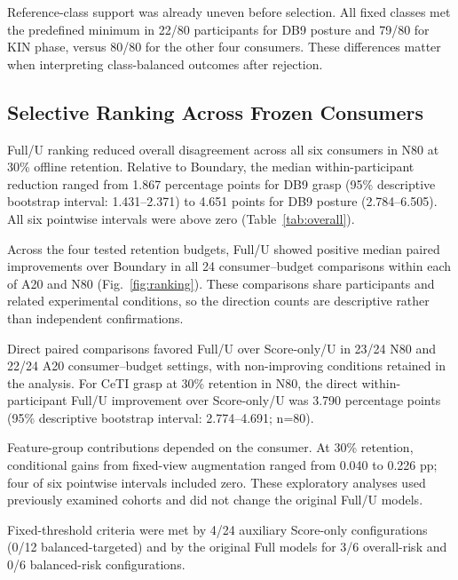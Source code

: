 Reference-class support was already uneven before selection. All fixed classes met the predefined minimum in 22/80 participants for DB9 posture and 79/80 for KIN phase, versus 80/80 for the other four consumers. These differences matter when interpreting class-balanced outcomes after rejection.

\subsection{Selective Ranking Across Frozen Consumers}\label{selective-ranking-across-frozen-consumers}
Full/U ranking reduced overall disagreement across all six consumers in N80 at 30\% offline retention. Relative to Boundary, the median within-participant reduction ranged from 1.867 percentage points for DB9 grasp (95\% descriptive bootstrap interval: 1.431--2.371) to 4.651 points for DB9 posture (2.784--6.505). All six pointwise intervals were above zero (Table~\ref{tab:overall}).

Across the four tested retention budgets, Full/U showed positive median paired improvements over Boundary in all 24 consumer--budget comparisons within each of A20 and N80 (Fig.~\ref{fig:ranking}). These comparisons share participants and related experimental conditions, so the direction counts are descriptive rather than independent confirmations.

Direct paired comparisons favored Full/U over Score-only/U in 23/24 N80 and 22/24 A20 consumer--budget settings, with non-improving conditions retained in the analysis. For CeTI grasp at 30\% retention in N80, the direct within-participant Full/U improvement over Score-only/U was 3.790 percentage points (95\% descriptive bootstrap interval: 2.774--4.691; n=80).



Feature-group contributions depended on the consumer. At 30\% retention, conditional gains from fixed-view augmentation ranged from 0.040 to 0.226 pp; four of six pointwise intervals included zero. These exploratory analyses used previously examined cohorts and did not change the original Full/U models.

Fixed-threshold criteria were met by 4/24 auxiliary Score-only configurations (0/12 balanced-targeted) and by the original Full models for 3/6 overall-risk and 0/6 balanced-risk configurations.



